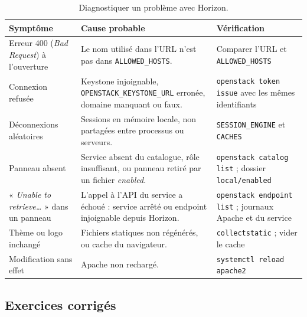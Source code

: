 \begin{table}[H]
\centering
\renewcommand{\arraystretch}{1.3}
\begin{tabular}{@{}>{\raggedright\arraybackslash}p{4.4cm}>{\raggedright\arraybackslash}p{5.8cm}>{\raggedright\arraybackslash}p{5.3cm}@{}}
\toprule
\textbf{Symptôme} & \textbf{Cause probable} & \textbf{Vérification} \\
\midrule
Erreur 400 (\emph{Bad Request}) à l'ouverture & Le nom utilisé dans l'URL n'est pas dans \texttt{ALLOWED\_\allowbreak HOSTS}. & Comparer l'URL et \texttt{ALLOWED\_\allowbreak HOSTS} \\
Connexion refusée & Keystone injoignable, \texttt{OPENSTACK\_\allowbreak KEYSTONE\_\allowbreak URL} erronée, domaine manquant ou faux. & \texttt{openstack token issue} avec les mêmes identifiants \\
Déconnexions aléatoires & Sessions en mémoire locale, non partagées entre processus ou serveurs. & \texttt{SESSION\_\allowbreak ENGINE} et \texttt{CACHES} \\
Panneau absent & Service absent du catalogue, rôle insuffisant, ou panneau retiré par un fichier \emph{enabled}. & \texttt{openstack catalog list} ; dossier \texttt{local/enabled} \\
« \emph{Unable to retrieve\dots} » dans un panneau & L'appel à l'API du service a échoué : service arrêté ou endpoint injoignable depuis Horizon. & \texttt{openstack endpoint list} ; journaux Apache et du service \\
Thème ou logo inchangé & Fichiers statiques non régénérés, ou cache du navigateur. & \texttt{collectstatic} ; vider le cache \\
Modification sans effet & Apache non rechargé. & \texttt{systemctl reload apache2} \\
\bottomrule
\end{tabular}
\caption{Diagnostiquer un problème avec Horizon.}
\label{tab:ho-pannes}
\end{table}

\subsection{Exercices corrigés}\label{sec:ho-exercices}

